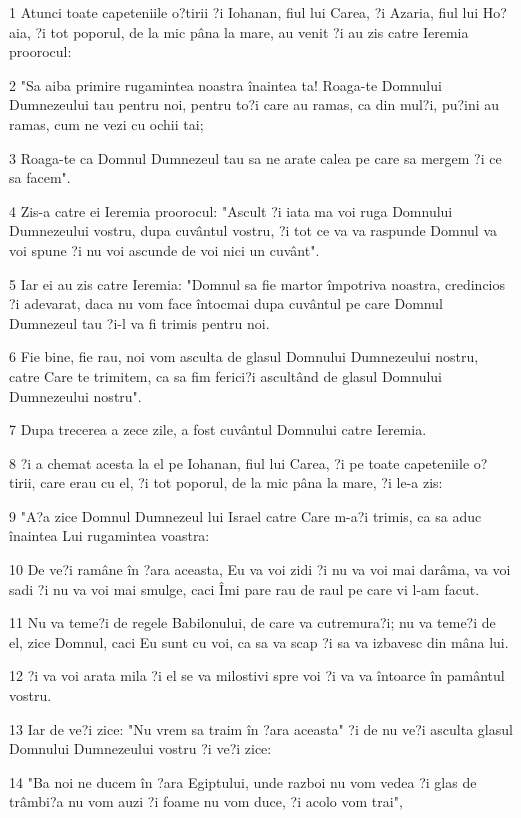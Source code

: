 \par 1 Atunci toate capeteniile o?tirii ?i Iohanan, fiul lui Carea, ?i Azaria, fiul lui Ho?aia, ?i tot poporul, de la mic pâna la mare, au venit ?i au zis catre Ieremia proorocul:
\par 2 "Sa aiba primire rugamintea noastra înaintea ta! Roaga-te Domnului Dumnezeului tau pentru noi, pentru to?i care au ramas, ca din mul?i, pu?ini au ramas, cum ne vezi cu ochii tai;
\par 3 Roaga-te ca Domnul Dumnezeul tau sa ne arate calea pe care sa mergem ?i ce sa facem".
\par 4 Zis-a catre ei Ieremia proorocul: "Ascult ?i iata ma voi ruga Domnului Dumnezeului vostru, dupa cuvântul vostru, ?i tot ce va va raspunde Domnul va voi spune ?i nu voi ascunde de voi nici un cuvânt".
\par 5 Iar ei au zis catre Ieremia: "Domnul sa fie martor împotriva noastra, credincios ?i adevarat, daca nu vom face întocmai dupa cuvântul pe care Domnul Dumnezeul tau ?i-l va fi trimis pentru noi.
\par 6 Fie bine, fie rau, noi vom asculta de glasul Domnului Dumnezeului nostru, catre Care te trimitem, ca sa fim ferici?i ascultând de glasul Domnului Dumnezeului nostru".
\par 7 Dupa trecerea a zece zile, a fost cuvântul Domnului catre Ieremia.
\par 8 ?i a chemat acesta la el pe Iohanan, fiul lui Carea, ?i pe toate capeteniile o?tirii, care erau cu el, ?i tot poporul, de la mic pâna la mare, ?i le-a zis:
\par 9 "A?a zice Domnul Dumnezeul lui Israel catre Care m-a?i trimis, ca sa aduc înaintea Lui rugamintea voastra:
\par 10 De ve?i ramâne în ?ara aceasta, Eu va voi zidi ?i nu va voi mai darâma, va voi sadi ?i nu va voi mai smulge, caci Îmi pare rau de raul pe care vi l-am facut.
\par 11 Nu va teme?i de regele Babilonului, de care va cutremura?i; nu va teme?i de el, zice Domnul, caci Eu sunt cu voi, ca sa va scap ?i sa va izbavesc din mâna lui.
\par 12 ?i va voi arata mila ?i el se va milostivi spre voi ?i va va întoarce în pamântul vostru.
\par 13 Iar de ve?i zice: "Nu vrem sa traim în ?ara aceasta" ?i de nu ve?i asculta glasul Domnului Dumnezeului vostru ?i ve?i zice:
\par 14 "Ba noi ne ducem în ?ara Egiptului, unde razboi nu vom vedea ?i glas de trâmbi?a nu vom auzi ?i foame nu vom duce, ?i acolo vom trai",
